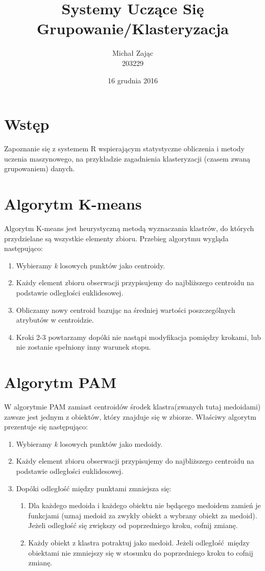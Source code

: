 \documentclass{article}
\title{Systemy Uczące Się \\ Grupowanie/Klasteryzacja}
\author{Michał Zając \\ 203229}
\date{16 grudnia 2016}
\begin{document}
\maketitle
\clearpage
\section{Wstęp}
Zapoznanie się z systemem R wspierającym statystyczne obliczenia i metody uczenia maszynowego, na przykładzie zagadnienia klasteryzacji (czasem zwaną grupowaniem) danych.

\section{Algorytm K-means}
 
Algorytm K-means jest heurystyczną metodą wyznaczania klastrów, do których przydzielane są wszystkie elementy zbioru. Przebieg algorytmu wygląda następująco:
 
\begin{enumerate}
\item Wybieramy \emph{k} losowych punktów jako centroidy.
\item Każdy element zbioru obserwacji przypisujemy do najbliższego centroidu na podstawie odległości euklidesowej.
\item Obliczamy nowy centroid bazując na średniej wartości poszczególnych atrybutów w centroidzie.
\item Kroki 2-3 powtarzamy dopóki nie nastąpi modyfikacja pomiędzy krokami, lub nie zostanie spełniony inny warunek stopu.
\end{enumerate}
 
\section{Algorytm PAM}
 
W algorytmie PAM zamiast centroidów środek klastra(zwanych tutaj medoidami) zawsze jest jednym z obiektów, który znajduje się w zbiorze. Właściwy algorytm prezentuje się następująco:
 
\begin{enumerate}
\item Wybieramy \emph{k} losowych punktów jako medoidy.
\item Każdy element zbioru obserwacji przypisujemy do najbliższego centroidu na podstawie odległości euklidesowej.
\item Dopóki odległość między punktami zmniejsza się:
\begin{enumerate}
\item Dla każdego medoida i każdego obiektu nie będącego medoidem zamień je funkcjami (uznaj medoid za zwykły obiekt a wybrany obiekt za medoid). Jeżeli odległość się zwiększy od poprzedniego kroku, cofnij zmianę.
\item Każdy obiekt z klastra potraktuj jako medoid. Jeżeli odległość między obiektami nie zmniejszy się w stosunku do poprzedniego kroku to cofnij zmianę.
\end{enumerate}
\end{enumerate}
\end{document}
